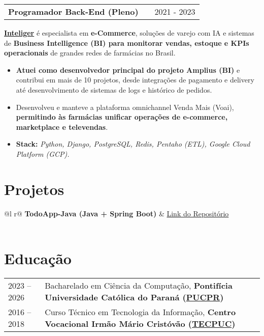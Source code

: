 \documentclass[a4paper,12pt]{article}
\makeatletter
\newenvironment{joblong}[2]
{
    \begin{tabularx}{\linewidth}{@{}l X r@{}}
        \textbf{#1} & \hfill & #2 \\[3.75pt]
    \end{tabularx}
    \begin{minipage}[t]{\linewidth}
    }
    {
    \end{minipage}
}
\newenvironment{bullets}
{
    \begin{itemize}[nosep,after=\strut, leftmargin=1em, itemsep=3pt,label=--]
    }
    {
    \end{itemize}
}
\makeatother
\begin{document}
    \begin{joblong}{Programador Back-End (Pleno)}{2021 - 2023}
        \href{https://inteliger.com.br}{\textbf{Inteliger}} é especialista em \textbf{e-Commerce}, soluções de varejo com IA e sistemas de \textbf{Business Intelligence (BI) para monitorar vendas, estoque e KPIs operacionais} de grandes redes de farmácias no Brasil.
        \begin{bullets}
            \item \textbf{Atuei como desenvolvedor principal do projeto Amplius (BI)} e contribui em mais de 10 projetos, desde integrações de pagamento e delivery até desenvolvimento de sistemas de logs e histórico de pedidos.
            \item Desenvolveu e manteve a plataforma omnichannel Venda Mais (Voai), \textbf{permitindo às farmácias unificar operações de e-commerce, marketplace e televendas}.
            \item \textbf{Stack:} \textit{Python, Django, PostgreSQL, Redis, Pentaho (ETL), Google Cloud Platform (GCP).}
        \end{bullets}
    \end{joblong}



    \section{Projetos}
    \begin{tabularx}{\linewidth}{ @{}l r@{} }
        \textbf{TodoApp-Java (Java + Spring Boot)} & \hfill \href{https://github.com/JoaoVLima/TodoApp-Java}{Link do Repositório} \\[3.75pt]
         \\
    \end{tabularx}




    \section{Educação}
    \begin{tabularx}{\linewidth}{@{}l X@{}}
        2023 -- 2026 & Bacharelado em Ciência da Computação, \textbf{Pontifícia Universidade Católica do Paraná (\href{https://www.pucpr.br}{PUCPR})} \\
        2016 -- 2018 & Curso Técnico em Tecnologia da Informação, \textbf{Centro Vocacional Irmão Mário Cristóvão (\href{http://www.tecpuc.com.br}{TECPUC})} \\
    \end{tabularx}
\end{document}
